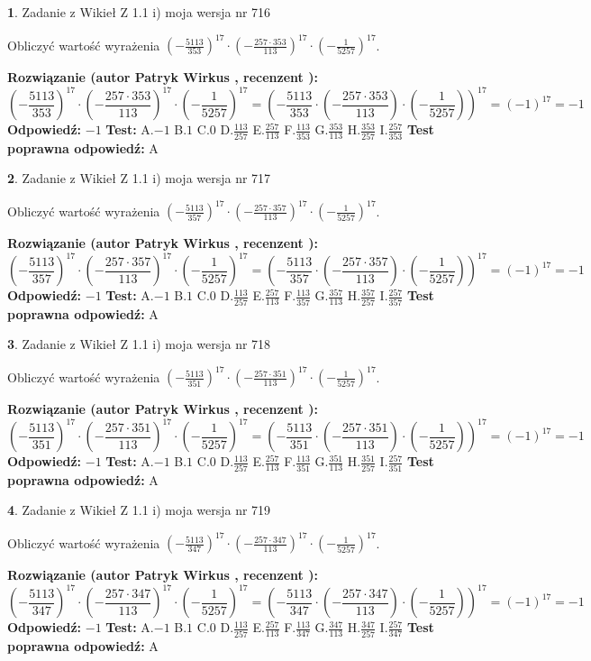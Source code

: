 \documentclass[12pt, a4paper]{article}
\theoremstyle{definition} %
\newtheorem{zad}{}
\newcommand{\zadStart}[1]{\begin{zad}#1\newline}
\newcommand{\zadStop}{\end{zad}}
\newcommand{\rozwStart}[2]{\noindent \textbf{Rozwiązanie (autor #1 , recenzent #2): }\newline}
\newcommand{\rozwStop}{\newline}
\newcommand{\odpStart}{\noindent \textbf{Odpowiedź:}\newline}
\newcommand{\odpStop}{\newline}
\newcommand{\testStart}{\noindent \textbf{Test:}\newline}
\newcommand{\testStop}{\newline}
\newcommand{\kluczStart}{\noindent \textbf{Test poprawna odpowiedź:}\newline}
\newcommand{\kluczStop}{\newline}
\begin{document}
\zadStart{Zadanie z Wikieł Z 1.1 i) moja wersja nr 716}

Obliczyć wartość wyrażenia $(-\frac{5113}{353})^{17} \cdot (-\frac{257 \cdot 353}{113})^{17} \cdot (-\frac{1}{5257})^{17}$.
\zadStop
\rozwStart{Patryk Wirkus}{}
$$(-\frac{5113}{353})^{17} \cdot (-\frac{257 \cdot 353}{113})^{17} \cdot (-\frac{1}{5257})^{17} = (-\frac{5113}{353} \cdot (-\frac{257 \cdot 353}{113}) \cdot (-\frac{1}{5257}))^{17} = (-1)^{17} = -1$$
\rozwStop
\odpStart
$-1$
\odpStop
\testStart
A.$-1$ B.$1$ C.$0$ D.$\frac{113}{257}$ E.$\frac{257}{113}$
F.$\frac{113}{353}$ G.$\frac{353}{113}$
H.$\frac{353}{257}$
I.$\frac{257}{353}$
\testStop
\kluczStart
A
\kluczStop



\zadStart{Zadanie z Wikieł Z 1.1 i) moja wersja nr 717}

Obliczyć wartość wyrażenia $(-\frac{5113}{357})^{17} \cdot (-\frac{257 \cdot 357}{113})^{17} \cdot (-\frac{1}{5257})^{17}$.
\zadStop
\rozwStart{Patryk Wirkus}{}
$$(-\frac{5113}{357})^{17} \cdot (-\frac{257 \cdot 357}{113})^{17} \cdot (-\frac{1}{5257})^{17} = (-\frac{5113}{357} \cdot (-\frac{257 \cdot 357}{113}) \cdot (-\frac{1}{5257}))^{17} = (-1)^{17} = -1$$
\rozwStop
\odpStart
$-1$
\odpStop
\testStart
A.$-1$ B.$1$ C.$0$ D.$\frac{113}{257}$ E.$\frac{257}{113}$
F.$\frac{113}{357}$ G.$\frac{357}{113}$
H.$\frac{357}{257}$
I.$\frac{257}{357}$
\testStop
\kluczStart
A
\kluczStop



\zadStart{Zadanie z Wikieł Z 1.1 i) moja wersja nr 718}

Obliczyć wartość wyrażenia $(-\frac{5113}{351})^{17} \cdot (-\frac{257 \cdot 351}{113})^{17} \cdot (-\frac{1}{5257})^{17}$.
\zadStop
\rozwStart{Patryk Wirkus}{}
$$(-\frac{5113}{351})^{17} \cdot (-\frac{257 \cdot 351}{113})^{17} \cdot (-\frac{1}{5257})^{17} = (-\frac{5113}{351} \cdot (-\frac{257 \cdot 351}{113}) \cdot (-\frac{1}{5257}))^{17} = (-1)^{17} = -1$$
\rozwStop
\odpStart
$-1$
\odpStop
\testStart
A.$-1$ B.$1$ C.$0$ D.$\frac{113}{257}$ E.$\frac{257}{113}$
F.$\frac{113}{351}$ G.$\frac{351}{113}$
H.$\frac{351}{257}$
I.$\frac{257}{351}$
\testStop
\kluczStart
A
\kluczStop



\zadStart{Zadanie z Wikieł Z 1.1 i) moja wersja nr 719}

Obliczyć wartość wyrażenia $(-\frac{5113}{347})^{17} \cdot (-\frac{257 \cdot 347}{113})^{17} \cdot (-\frac{1}{5257})^{17}$.
\zadStop
\rozwStart{Patryk Wirkus}{}
$$(-\frac{5113}{347})^{17} \cdot (-\frac{257 \cdot 347}{113})^{17} \cdot (-\frac{1}{5257})^{17} = (-\frac{5113}{347} \cdot (-\frac{257 \cdot 347}{113}) \cdot (-\frac{1}{5257}))^{17} = (-1)^{17} = -1$$
\rozwStop
\odpStart
$-1$
\odpStop
\testStart
A.$-1$ B.$1$ C.$0$ D.$\frac{113}{257}$ E.$\frac{257}{113}$
F.$\frac{113}{347}$ G.$\frac{347}{113}$
H.$\frac{347}{257}$
I.$\frac{257}{347}$
\testStop
\kluczStart
A
\kluczStop
\end{document}
